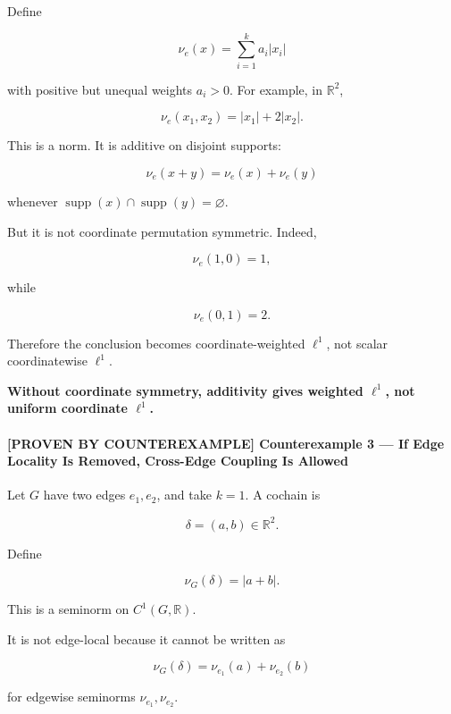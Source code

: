 \documentclass[
  11pt,
]{article}
\renewenvironment{quote}
  {\begin{leftbar}\small}
  {\end{leftbar}}
\begin{document}
Define

\[
\nu_e(x)=\sum_{i=1}^k a_i |x_i|
\]

with positive but unequal weights \(a_i>0\). For example, in
\(\mathbb R^2\),

\[
\nu_e(x_1,x_2)=|x_1|+2|x_2|.
\]

This is a norm. It is additive on disjoint supports:

\[
\nu_e(x+y)=\nu_e(x)+\nu_e(y)
\]

whenever
\(\operatorname{supp}(x)\cap\operatorname{supp}(y)=\varnothing\).

But it is not coordinate permutation symmetric. Indeed,

\[
\nu_e(1,0)=1,
\]

while

\[
\nu_e(0,1)=2.
\]

Therefore the conclusion becomes coordinate-weighted \(\ell^1\), not
scalar coordinatewise \(\ell^1\).

\begin{quote}
\textbf{Without coordinate symmetry, additivity gives weighted
\(\ell^1\), not uniform coordinate \(\ell^1\).}
\end{quote}

\hypertarget{proven-by-counterexample-counterexample-3-if-edge-locality-is-removed-cross-edge-coupling-is-allowed}{%
\paragraph{\texorpdfstring{\textbf{{[}PROVEN BY COUNTEREXAMPLE{]}
Counterexample 3 --- If Edge Locality Is Removed, Cross-Edge Coupling Is
Allowed}}{{[}PROVEN BY COUNTEREXAMPLE{]} Counterexample 3 --- If Edge Locality Is Removed, Cross-Edge Coupling Is Allowed}}\label{proven-by-counterexample-counterexample-3-if-edge-locality-is-removed-cross-edge-coupling-is-allowed}}

Let \(G\) have two edges \(e_1,e_2\), and take \(k=1\). A cochain is

\[
\delta=(a,b)\in\mathbb R^2.
\]

Define

\[
\nu_G(\delta)=|a+b|.
\]

This is a seminorm on \(C^1(G,\mathbb R)\).

It is not edge-local because it cannot be written as

\[
\nu_G(\delta)=\nu_{e_1}(a)+\nu_{e_2}(b)
\]

for edgewise seminorms \(\nu_{e_1},\nu_{e_2}\).
\end{document}
